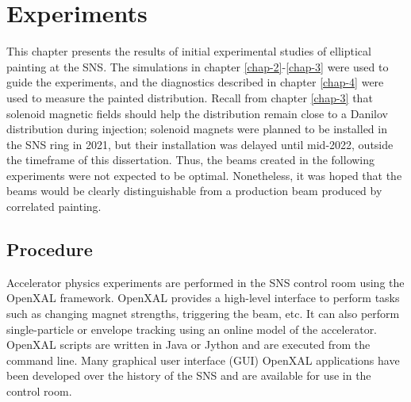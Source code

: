 \chapter{Experiments} \label{chap-5}

This chapter presents the results of initial experimental studies of elliptical painting at the SNS. The simulations in chapter \ref{chap-2}-\ref{chap-3} were used to guide the experiments, and the diagnostics described in chapter \ref{chap-4} were used to measure the painted distribution. Recall from chapter \ref{chap-3} that solenoid magnetic fields should help the distribution remain close to a Danilov distribution during injection; solenoid magnets were planned to be installed in the SNS ring in 2021, but their installation was delayed until mid-2022, outside the timeframe of this dissertation. Thus, the beams created in the following experiments were not expected to be optimal. Nonetheless, it was hoped that the beams would be clearly distinguishable from a production beam produced by correlated painting. 


\section{Procedure}

Accelerator physics experiments are performed in the SNS control room using the OpenXAL framework. OpenXAL provides a high-level interface to perform tasks such as changing magnet strengths, triggering the beam, etc. It can also perform single-particle or envelope tracking using an online model of the accelerator. OpenXAL scripts are written in Java or Jython and are executed from the command line. Many graphical user interface (GUI) OpenXAL applications have been developed over the history of the SNS and are available for use in the control room. 

